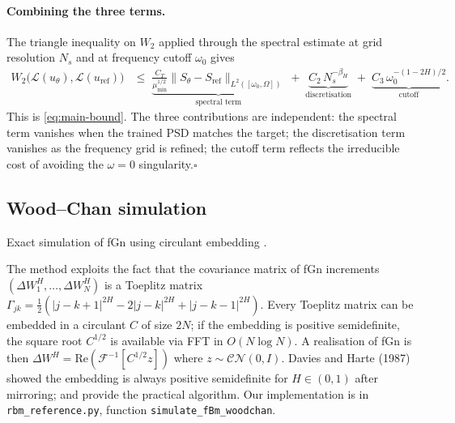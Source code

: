 \documentclass[11pt,a4paper]{article}
\begin{document}
\paragraph{Combining the three terms.}
The triangle inequality on $W_2$ applied through the spectral estimate at
grid resolution $N_s$ and at frequency cutoff $\omega_0$ gives
\begin{align*}
 W_2\!\bigl(\mathcal{L}(u_\theta),\mathcal{L}(u_{\mathrm{ref}})\bigr)
 &\leq\;
 \underbrace{\frac{C_T}{\mu_{\min}^{1/2}}
 \bigl\|S_\theta-S_{\mathrm{ref}}\bigr\|_{L^2([\omega_0,\Omega])}}_{\text{spectral term}}
 \;+\;
 \underbrace{C_2\,N_s^{-\beta_H}}_{\text{discretisation}}
 \;+\;
 \underbrace{C_3\,\omega_0^{-(1-2H)/2}}_{\text{cutoff}}.
\end{align*}
This is \eqref{eq:main-bound}. The three contributions are independent:
the spectral term vanishes when the trained PSD matches the target;
the discretisation term vanishes as the frequency grid is refined;
the cutoff term reflects the irreducible cost of avoiding the $\omega = 0$
singularity.\hfill$\square$

\subsection{Wood--Chan simulation}
\label{app:wood-chan}

Exact simulation of fGn using circulant embedding
\citep{wood1994simulation, dietrich1997fast}.

The method exploits the fact that the covariance matrix of fGn increments
$(\Delta W^H_1, \ldots, \Delta W^H_N)$ is a Toeplitz matrix
$\Gamma_{jk} = \tfrac{1}{2}(|j-k+1|^{2H} - 2|j-k|^{2H} + |j-k-1|^{2H})$.
Every Toeplitz matrix can be embedded in a circulant $C$ of size $2N$;
if the embedding is positive semidefinite, the square root
$C^{1/2}$ is available via FFT in $O(N\log N)$. A realisation
of fGn is then $\Delta W^H = \mathrm{Re}(\mathcal{F}^{-1}[C^{1/2}z])$
where $z \sim \mathcal{CN}(0, I)$. Davies and Harte (1987) showed the
embedding is always positive semidefinite for $H \in (0,1)$ after
mirroring; \citet{wood1994simulation} and \citet{dietrich1997fast}
provide the practical algorithm. Our implementation is in
\texttt{rbm\_reference.py}, function \texttt{simulate\_fBm\_woodchan}.



\end{document}
